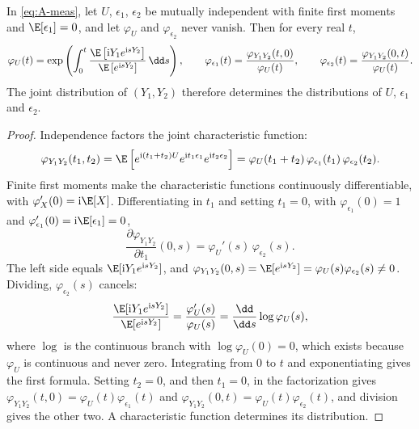 \begin{lemma}[Kotlarski]\label{lem:A-kotlarski}
In \eqref{eq:A-meas}, let $U$, $\epsilon_1$, $\epsilon_2$ be mutually independent with finite first
moments and $\E[\epsilon_1]=0$, and let $\varphi_U$ and $\varphi_{\epsilon_2}$ never vanish. Then for every
real $t$,
\begin{equation}\label{eq:A-kotlarski}
\varphi_U(t)=\exp\left(\int_0^t\frac{\E\left[\mathrm{i}Y_1e^{\mathrm{i}sY_2}\right]}{\E\left[e^{\mathrm{i}sY_2}\right]}\,\dd s\right),\qquad
\varphi_{\epsilon_1}(t)=\frac{\varphi_{Y_1Y_2}(t,0)}{\varphi_U(t)},\qquad
\varphi_{\epsilon_2}(t)=\frac{\varphi_{Y_1Y_2}(0,t)}{\varphi_U(t)} .
\end{equation}
The joint distribution of $(Y_1,Y_2)$ therefore determines the distributions of $U$, $\epsilon_1$ and
$\epsilon_2$.
\end{lemma}

\begin{proof}
Independence factors the joint characteristic function:
\begin{equation*}
\varphi_{Y_1Y_2}(t_1,t_2)=\E\left[e^{\mathrm{i}(t_1+t_2)U}e^{\mathrm{i}t_1\epsilon_1}e^{\mathrm{i}t_2\epsilon_2}\right]
=\varphi_U(t_1+t_2)\,\varphi_{\epsilon_1}(t_1)\,\varphi_{\epsilon_2}(t_2).
\end{equation*}
Finite first moments make the characteristic functions continuously differentiable, with
$\varphi_X'(0)=\mathrm{i}\E[X]$. Differentiating in $t_1$ and setting $t_1=0$, with $\varphi_{\epsilon_1}(0)=1$
and $\varphi_{\epsilon_1}'(0)=\mathrm{i}\E[\epsilon_1]=0$,
\begin{equation*}
\frac{\partial\varphi_{Y_1Y_2}}{\partial t_1}(0,s)=\varphi_U'(s)\,\varphi_{\epsilon_2}(s).
\end{equation*}
The left side equals $\E[\mathrm{i}Y_1e^{\mathrm{i}sY_2}]$, and $\varphi_{Y_1Y_2}(0,s)=\E[e^{\mathrm{i}sY_2}]=\varphi_U(s)\varphi_{\epsilon_2}(s)\ne0$.
Dividing, $\varphi_{\epsilon_2}(s)$ cancels:
\begin{equation*}
\frac{\E[\mathrm{i}Y_1e^{\mathrm{i}sY_2}]}{\E[e^{\mathrm{i}sY_2}]}=\frac{\varphi_U'(s)}{\varphi_U(s)}=\frac{\dd}{\dd s}\log\varphi_U(s),
\end{equation*}
where $\log$ is the continuous branch with $\log\varphi_U(0)=0$, which exists because $\varphi_U$ is
continuous and never zero. Integrating from 0 to $t$ and exponentiating gives the first formula. Setting
$t_2=0$, and then $t_1=0$, in the factorization gives $\varphi_{Y_1Y_2}(t,0)=\varphi_U(t)\varphi_{\epsilon_1}(t)$ and
$\varphi_{Y_1Y_2}(0,t)=\varphi_U(t)\varphi_{\epsilon_2}(t)$, and division gives the other two. A characteristic
function determines its distribution.
\end{proof}

